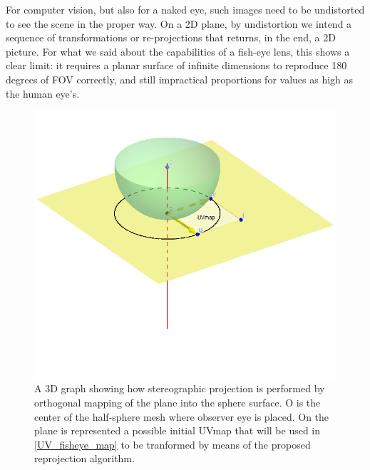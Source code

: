 For computer vision, but also for a naked eye, such images need to be undistorted to see the scene in the proper way. On a 2D plane, by undistortion we intend a sequence of transformations or re-projections that returns, in the end, a 2D picture. For what we said about the capabilities of a fish-eye lens, this shows a clear limit: it requires a planar surface of infinite dimensions to reproduce 180 degrees of FOV correctly, and still impractical proportions for values as high as the human eye's.

\begin{figure}
\centering
\includegraphics[width=0.8\linewidth]{schemas/stereographic_ortho_projection}
\vspace*{-8mm}
\caption{A 3D graph showing how stereographic projection is performed by orthogonal mapping of the plane into the sphere surface. O is the center of the half-sphere mesh where observer eye is placed. On the plane is represented a possible initial UVmap that will be used in \ref{UV_fisheye_map} to be tranformed by means of the proposed reprojection algorithm.}
\label{fig:fisheye_uv_mapped}
\end{figure}

